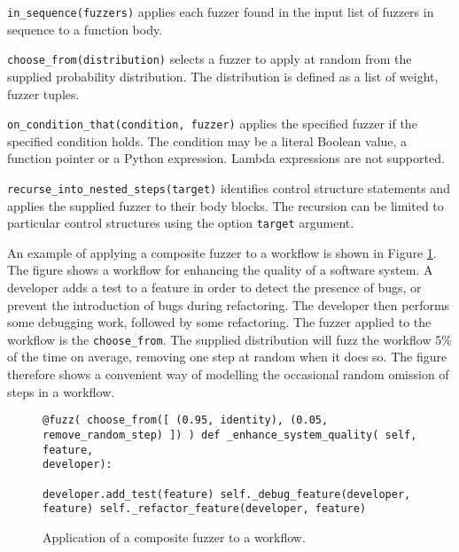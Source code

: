 \documentclass{sig-alternate}
\newenvironment{FunctionList}{%
\lstset{basicstyle=\ttfamily\bfseries\small}
\begin{list}{}{\leftmargin=5pt}
}{\end{list}\lstset{basicstyle=\ttfamily\small}}
\begin{document}
\begin{FunctionList}
\item \lstinline!in_sequence(fuzzers)! applies each fuzzer found in the input list of fuzzers in sequence to a function
  body.

\item \lstinline!choose_from(distribution)! selects a fuzzer to apply at random from the supplied probability
  distribution.  The distribution is defined as a list of weight, fuzzer tuples.

\item \lstinline!on_condition_that(condition, fuzzer)! %
  applies the specified fuzzer if the specified condition holds.  The condition may be a literal Boolean value, a
  function pointer or a Python expression.  Lambda expressions are not supported.

\item \lstinline!recurse_into_nested_steps(target)! identifies control structure statements and applies the supplied
  fuzzer to their body blocks.  The recursion can be limited to particular control structures using the option
  \lstinline!target! argument.
\end{FunctionList}

An example of applying a composite fuzzer to a workflow is shown in Figure \ref{fig:composite}.  The figure shows a
workflow for enhancing the quality of a software system.  A developer adds a test to a feature in order to detect the
presence of bugs, or prevent the introduction of bugs during refactoring.  The developer then performs some debugging
work, followed by some refactoring.  The fuzzer applied to the workflow is the \lstinline!choose_from!.  The supplied
distribution will fuzz the workflow 5\% of the time on average, removing one step at random when it does so.  The figure
therefore shows a convenient way of modelling the occasional random omission of steps in a workflow.

\begin{figure}
  \centering

\begin{lstlisting}
@fuzz( choose_from([ (0.95, identity), (0.05, remove_random_step) ]) ) def _enhance_system_quality( self, feature,
developer):

developer.add_test(feature) self._debug_feature(developer, feature) self._refactor_feature(developer, feature)
\end{lstlisting}
  
  \caption{Application of a composite fuzzer to a workflow.}
  \label{fig:composite}
\end{figure}
\end{document}
